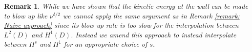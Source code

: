 \documentclass[11pt, reqno]{article}
\def\R{{\mathbb R}} %
\newtheorem{remark}[theorem]{Remark}
\def\Ex{\mathcal{E}}
\begin{document}
\begin{remark}\label{remark: Besov Space Interpolation}
While we have shown that the kinetic energy at the wall can be made to blow up like $\nu^{\delta/2}$ we cannot apply the same argument as in Remark \ref{remark: Naive approach} since its blow up rate is too slow for the interpolation between $L^2(D)$ and $H^1(D)$. Instead we amend this approach to instead interpolate between $H^s$ and $H^1$ for an appropriate choice of $s$.

\end{remark}
\end{document}
